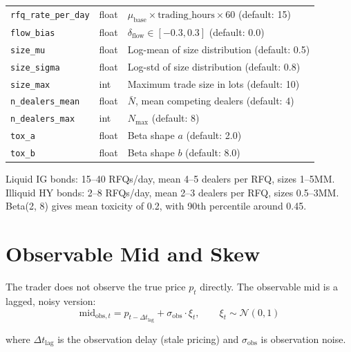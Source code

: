 \documentclass[11pt,a4paper]{article}
\begin{document}
\begin{parambox}[Knobs]
\begin{tabular}{@{}lll@{}}
\texttt{rfq\_rate\_per\_day} & float & $\mu_{\text{base}} \times \text{trading\_hours} \times 60$ (default: 15) \\
\texttt{flow\_bias} & float & $\delta_{\text{flow}} \in [-0.3, 0.3]$ (default: 0.0) \\
\texttt{size\_mu} & float & Log-mean of size distribution (default: 0.5) \\
\texttt{size\_sigma} & float & Log-std of size distribution (default: 0.8) \\
\texttt{size\_max} & int & Maximum trade size in lots (default: 10) \\
\texttt{n\_dealers\_mean} & float & $\bar{N}$, mean competing dealers (default: 4) \\
\texttt{n\_dealers\_max} & int & $N_{\max}$ (default: 8) \\
\texttt{tox\_a} & float & Beta shape $a$ (default: 2.0) \\
\texttt{tox\_b} & float & Beta shape $b$ (default: 8.0) \\
\end{tabular}
\end{parambox}

\begin{specbox}
Liquid IG bonds: 15--40 RFQs/day, mean 4--5 dealers per RFQ, sizes 1--5MM.\\
Illiquid HY bonds: 2--8 RFQs/day, mean 2--3 dealers per RFQ, sizes 0.5--3MM.\\
Beta(2, 8) gives mean toxicity of 0.2, with 90th percentile around 0.45.
\end{specbox}


\section{Observable Mid and Skew}\label{sec:skew}

The trader does not observe the true price $p_t$ directly. The observable mid is a lagged, noisy version:
\begin{equation}
\text{mid}_{\text{obs},t} = p_{t - \Delta t_{\text{lag}}} + \sigma_{\text{obs}} \cdot \xi_t, \qquad \xi_t \sim \mathcal{N}(0,1)
\end{equation}

where $\Delta t_{\text{lag}}$ is the observation delay (stale pricing) and $\sigma_{\text{obs}}$ is observation noise.
\end{document}
